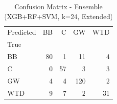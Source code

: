 \begin{table}
\caption{Confusion Matrix - Ensemble (XGB+RF+SVM, k=24, Extended)}
\label{tab:ensemble_ext_cm}
\begin{tabular}{lrrrr}
\toprule
Predicted & BB & C & GW & WTD \\
True &  &  &  &  \\
\midrule
BB & 80 & 1 & 11 & 4 \\
C & 0 & 57 & 3 & 3 \\
GW & 4 & 4 & 120 & 2 \\
WTD & 9 & 7 & 2 & 31 \\
\bottomrule
\end{tabular}
\end{table}
